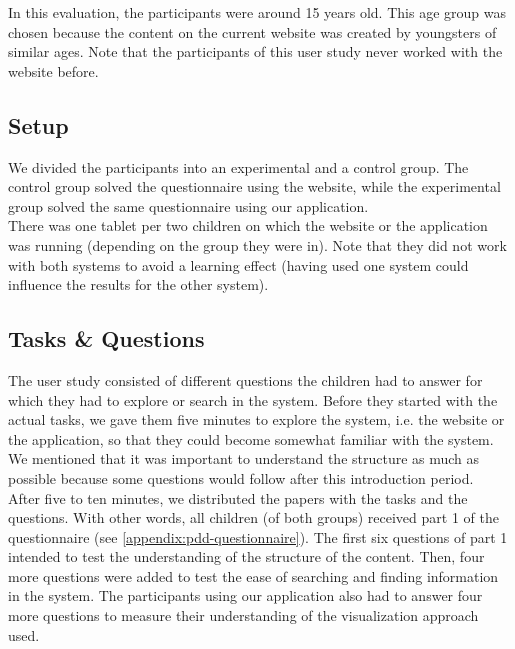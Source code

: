 In this evaluation, the participants were around 15 years old. This age group was chosen because the content on the current website was created by youngsters of similar ages. Note that the participants of this user study never worked with the website before.

\subsection{Setup}
We divided the participants into an experimental and a control group. The control group solved the questionnaire using the website, while the experimental group solved the same questionnaire using our application.\\

There was one tablet per two children on which the website or the application was running (depending on the group they were in). Note that they did not work with both systems to avoid a learning effect (having used one system could influence the results for the other system). 

\subsection{Tasks \& Questions}
The user study consisted of different questions the children had to answer for which they had to explore or search in the system. Before they started with the actual tasks, we gave them five minutes to explore the system, i.e. the website or the application, so that they could become somewhat familiar with the system. We mentioned that it was important to understand the structure as much as possible because some questions would follow after this introduction period.\\

After five to ten minutes, we distributed the papers with the tasks and the questions. With other words, all children (of both groups) received part 1 of the questionnaire (see \autoref{appendix:pdd-questionnaire}). The first six questions of part 1 intended to test the understanding of the structure of the content. Then, four more questions were added to test the ease of searching and finding information in the system. The participants using our application also had to answer four more questions to measure their understanding of the visualization approach used.\\

